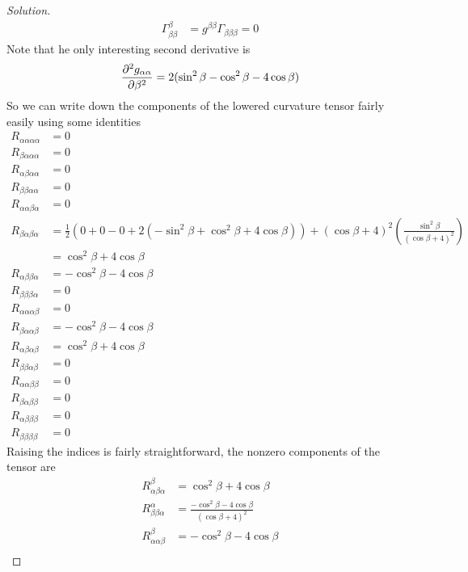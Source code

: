\documentclass[a4paper]{article}
\begin{document}
\begin{proof}[Solution]
\[\begin{aligned}
    \Gamma^\beta_{\beta \beta} &= g^{\beta \beta} \Gamma_{\beta \beta \beta} = 0
    \end{aligned}
  \]
  Note that he only interesting second derivative is
  \[
    \pdv[2]{g_{\alpha \alpha}}{\beta} = 2(\sin^2 \beta - \cos^2 \beta - 4 \cos \beta)
  \]
  So we can write down the components of the lowered curvature tensor fairly easily using some identities
  \[
    \begin{aligned}
      R_{\alpha \alpha \alpha \alpha} &= 0 \\
      R_{\beta \alpha \alpha \alpha} &= 0 \\
      R_{\alpha \beta \alpha \alpha} &= 0 \\
      R_{\beta \beta \alpha \alpha} &= 0 \\
      R_{\alpha \alpha \beta \alpha} &= 0 \\
      R_{\beta \alpha \beta \alpha} &= \frac{1}{2} \left(0 + 0 - 0 + 2(-\sin^2 \beta + \cos^2 \beta + 4 \cos \beta) \right) + \left( \cos \beta + 4\right)^2\left(\frac{\sin^2 \beta}{(\cos \beta + 4)^2}\right)  \\
                                    &= \cos^2 \beta + 4 \cos \beta \\
      R_{\alpha \beta \beta \alpha} &= -\cos^2 \beta - 4 \cos \beta \\
      R_{\beta \beta \beta \alpha} &= 0 \\
      R_{\alpha \alpha \alpha \beta} &= 0 \\
      R_{\beta \alpha \alpha \beta} &= - \cos^2 \beta - 4 \cos \beta \\
      R_{\alpha \beta \alpha \beta} &= \cos^2 \beta + 4 \cos \beta \\
      R_{\beta \beta \alpha \beta} &= 0 \\
      R_{\alpha \alpha \beta \beta} &= 0 \\
      R_{\beta \alpha \beta \beta} &= 0 \\
      R_{\alpha \beta \beta \beta} &= 0 \\
      R_{\beta \beta \beta \beta} &= 0
    \end{aligned}
  \]
  Raising the indices is fairly straightforward, the nonzero components of the tensor are
  \[
    \begin{aligned}
      R^\beta_{\alpha \beta \alpha} &= \cos^2 \beta + 4 \cos \beta \\
      R^\alpha_{\beta \beta \alpha} &= \frac{-\cos^2 \beta - 4 \cos \beta}{(\cos \beta + 4)^2} \\
      R^\beta_{\alpha \alpha \beta} &= - \cos^2 \beta - 4 \cos \beta \\

\end{aligned}\]
\end{proof}
\end{document}
